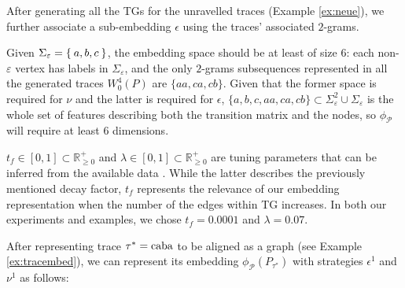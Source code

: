 \begin{example}\label{ex:withpaths} After generating all the TGs for the unravelled traces (Example \ref{ex:neue}), we further associate a sub-embedding $\epsilon$ using the traces' associated $2$-grams. 
	
Given $\Sigma_\varepsilon=\Set{a,b,c}$, the embedding space should be at least of size $6$: each non-$\varepsilon$ vertex has labels in $\Sigma_\varepsilon$, and the only $2$-grams subsequences represented in all the generated traces $W^4_0(P)$ are $\{aa,ca,cb\}$. Given that the former space is required for $\nu$ and the latter is required for $\epsilon$, 	
	 $\{a,b,c,aa,ca,cb\}\subset \Sigma_\varepsilon^2\cup\Sigma_\varepsilon$ is the whole set of features describing both the transition matrix and the nodes, so $\phi_{\mathcal{P}}$ will require at least 6 dimensions. 
	
	$t_f\in [0,1]\subset\mathbb{R}^+_{\geq 0}$ and $\lambda\in [0,1]\subset\mathbb{R}^+_{\geq 0}$ are tuning parameters that can be inferred from the available data \cite{DriessensRG06}. While the latter describes the previously mentioned decay factor, $t_f$ represents the relevance of our embedding representation when the number of the edges within TG increases. In both our experiments and examples, 
	we chose $t_f=0.0001$ and $\lambda=0.07$. 


{After representing trace $\tau^*=\textup{caba}$ to be aligned as a graph (see Example \ref{ex:tracembed}), we can represent its}
embedding $\phi_{\mathcal{P}}(P_{\tau^*})$ with strategies $\epsilon^1$ and $\nu^1$ %
{as follows:}


\end{example}
